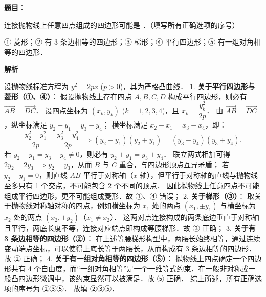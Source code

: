 \begin{answer}

\textbf{题目}：

连接抛物线上任意四点组成的四边形可能是 \gkblank{}．（填写所有正确选项的序号）

① 菱形；② 有 3 条边相等的四边形；③ 梯形；④ 平行四边形；⑤ 有一组对角相等的四边形．

\textbf{解析}

设抛物线标准方程为 $y^2 = 2px$ ($p > 0$)，其为严格凸曲线．
1. \textbf{关于平行四边形与菱形（①、④）}：
假设抛物线上存在四点 $A, B, C, D$ 构成平行四边形，则必有 $\overrightarrow{AB} = \overrightarrow{DC}$．
设四点坐标为 $(x_k, y_k)$ ($k = 1, 2, 3, 4$)，且 $x_k = \dfrac{y_k^2}{2p}$．
由 $\overrightarrow{AB} = \overrightarrow{DC}$，纵坐标满足 $y_2 - y_1 = y_3 - y_4$；
横坐标满足 $x_2 - x_1 = x_3 - x_4$，即：
\nopagebreak[4]
\[
\frac{y_2^2 - y_1^2}{2p} = \frac{y_3^2 - y_4^2}{2p} \implies (y_2 - y_1)(y_2 + y_1) = (y_3 - y_4)(y_3 + y_4).
\]
若 $y_2 - y_1 = y_3 - y_4 \neq 0$，则必有 $y_2 + y_1 = y_3 + y_4$．
联立两式相加可得 $2y_2 = 2y_3 \implies y_2 = y_3$，从而 $B$ 与 $C$ 重合，与四边形顶点互异矛盾；
若 $y_2 - y_1 = 0$，则直线 $AB$ 平行于对称轴（$x$ 轴），但平行于对称轴的直线与抛物线至多只有 1 个交点，不可能包含 2 个不同的顶点．
因此抛物线上任意四点不可能组成平行四边形，更不可能组成菱形．故 ①、④ 错误；
2. \textbf{关于梯形（③）}：
取关于抛物线对称轴对称的四点，例如横坐标为 $x_1$ 处的两点 $(x_1, \pm y_1)$ 与横坐标为 $x_2$ 处的两点 $(x_2, \pm y_2)$（$x_1 \neq x_2$）．
这两对点连接构成的两条底边垂直于对称轴且平行，两底长度不等，连接对应端点即构成等腰梯形．故 ③ 正确；
3. \textbf{关于有 3 条边相等的四边形（②）}：
在上述等腰梯形构型中，两腰长始终相等，通过连续变动端点坐标，可以使得上底长等于两腰长，从而构成有 3 条边相等的四边形．故 ② 正确；
4. \textbf{关于有一组对角相等的四边形（⑤）}：
抛物线上四点确定一个四边形共有 4 个自由度，而“一组对角相等”是一个一维等式约束．在一般非对称或一般凸四边形微调中，该约束显然可以被满足．故 ⑤ 正确．
综上所述，所有正确选项的序号为 ②③⑤．
故填 ②③⑤．


\end{answer}

